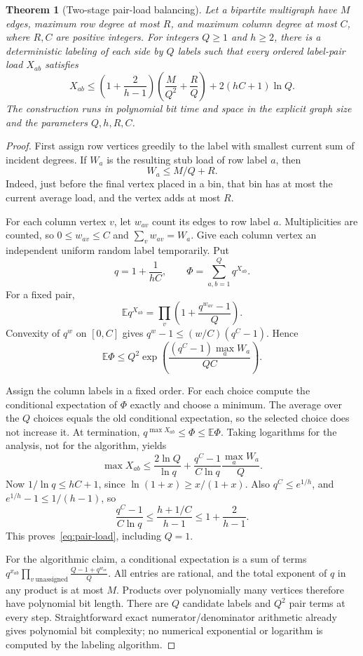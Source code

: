 \documentclass[11pt,letterpaper]{article}
\newtheorem{theorem}{Theorem}[section]
\theoremstyle{remark}\newtheorem{remark}[theorem]{Remark}
\begin{document}
\begin{theorem}[Two-stage pair-load balancing]\label{thm:pair-balance}
Let a bipartite multigraph have $M$ edges, maximum row degree at most
$R$, and maximum column degree at most $C$, where $R,C$ are positive
integers. For integers $Q\ge1$
and $h\ge2$, there is a deterministic labeling of each side by $Q$ labels
such that every ordered label-pair load $X_{ab}$ satisfies
\begin{equation}\label{eq:pair-load}
 X_{ab}\le\left(1+\frac{2}{h-1}\right)
              \left(\frac{M}{Q^2}+\frac{R}{Q}\right)
          +2(hC+1)\ln Q.
\end{equation}
The construction runs in polynomial bit time and space in the explicit
graph size and the parameters $Q,h,R,C$.
\end{theorem}
\begin{proof}
First assign row vertices greedily to the label with smallest current
sum of incident degrees. If $W_a$ is the resulting stub load of row
label $a$, then
\[
 W_a\le M/Q+R.
\]
Indeed, just before the final vertex placed in a bin, that bin has at
most the current average load, and the vertex adds at most $R$.

For each column vertex $v$, let $w_{av}$ count its edges to row label
$a$. Multiplicities are counted, so $0\le w_{av}\le C$ and
$\sum_vw_{av}=W_a$. Give each column vertex an independent uniform
random label temporarily. Put
\[
 q=1+\frac1{hC},\qquad \Phi=\sum_{a,b=1}^Q q^{X_{ab}}.
\]
For a fixed pair,
\[
 \mathbb E q^{X_{ab}}
   =\prod_v\left(1+\frac{q^{w_{av}}-1}{Q}\right).
\]
Convexity of $q^w$ on $[0,C]$ gives
$q^w-1\le(w/C)(q^C-1)$. Hence
\begin{equation}\label{eq:expected-potential}
 \mathbb E\Phi\le Q^2
 \exp\left(\frac{(q^C-1)\max_aW_a}{QC}\right).
\end{equation}

Assign the column labels in a fixed order. For each choice compute the
conditional expectation of $\Phi$ exactly and choose a minimum. The
average over the $Q$ choices equals the old conditional expectation, so
the selected choice does not increase it. At termination,
$q^{\max X_{ab}}\le\Phi\le\mathbb E\Phi$. Taking logarithms for the
analysis, not for the algorithm, yields
\[
 \max X_{ab}\le\frac{2\ln Q}{\ln q}
       +\frac{q^C-1}{C\ln q}\frac{\max_aW_a}{Q}.
\]
Now $1/\ln q\le hC+1$, since $\ln(1+x)\ge x/(1+x)$.
Also $q^C\le e^{1/h}$, and $e^{1/h}-1\le1/(h-1)$, so
\[
 \frac{q^C-1}{C\ln q}
 \le\frac{h+1/C}{h-1}\le1+\frac2{h-1}.
\]
This proves~\eqref{eq:pair-load}, including $Q=1$.

For the algorithmic claim, a conditional expectation is a sum of terms
$q^{x_{ab}}\prod_{v\ \mathrm{unassigned}}\frac{Q-1+q^{w_{av}}}{Q}$.
All entries are rational, and the total exponent of $q$ in any product
is at most $M$. Products over polynomially many vertices therefore have
polynomial bit length. There are $Q$ candidate labels and $Q^2$ pair
terms at every step. Straightforward exact numerator/denominator
arithmetic already gives polynomial bit complexity; no numerical
exponential or logarithm is computed by the labeling algorithm.
\end{proof}
\end{document}

